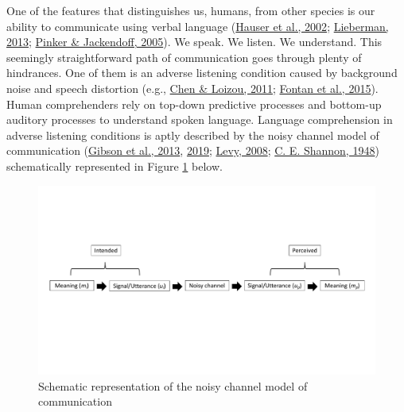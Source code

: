 \documentclass[a4paper, nobind]{templates/ociamthesis}
\begin{document}
One of the features that distinguishes us, humans, from other species is our ability to communicate using verbal language (\protect\hyperlink{ref-Hauser2002}{Hauser et al., 2002}; \protect\hyperlink{ref-Lieberman2013}{Lieberman, 2013}; \protect\hyperlink{ref-Pinker2005a}{Pinker \& Jackendoff, 2005}).
We speak. We listen. We understand.
This seemingly straightforward path of communication goes through plenty of hindrances.
One of them is an adverse listening condition caused by background noise and speech distortion (e.g., \protect\hyperlink{ref-Chen2011}{Chen \& Loizou, 2011}; \protect\hyperlink{ref-Fontan2015}{Fontan et al., 2015}).
Human comprehenders rely on top-down predictive processes and bottom-up auditory processes to understand spoken language.
Language comprehension in adverse listening conditions is aptly described by the noisy channel model of communication (\protect\hyperlink{ref-Gibson2013}{Gibson et al., 2013}, \protect\hyperlink{ref-Gibson2019}{2019}; \protect\hyperlink{ref-Levy2008}{Levy, 2008}; \protect\hyperlink{ref-Shannon1948}{C. E. Shannon, 1948})
schematically represented in Figure \ref{fig:noisy-channel} below.

\begin{figure}[!htpb]

{\centering \includegraphics[width=0.9\linewidth]{figures/materials/noisy-channel} 

}

\caption{Schematic representation of the noisy channel model of communication}\label{fig:noisy-channel}
\end{figure}
\end{document}
